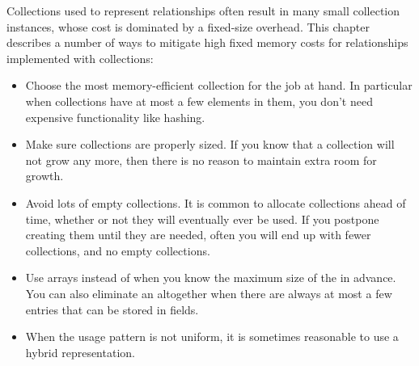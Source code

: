 Collections used to represent relationships often result in many small
collection instances, whose cost is dominated by a fixed-size
overhead. This chapter describes a number of ways to mitigate high fixed memory
costs for relationships implemented with collections:
\begin{itemize}
  \item Choose the most memory-efficient collection for the job at hand. In
  particular when collections have at most a few elements in them, you don't
  need expensive functionality like hashing. 
  \item Make sure collections are properly sized. If you know that a collection
  will not grow any more, then there is no reason to maintain extra room for
  growth.
  \item Avoid lots of empty collections. It is common to allocate collections 
 ahead of time, whether or not they will eventually ever be used. If you
 postpone creating them until they are needed, often you will end up with fewer collections, 
 and no empty collections.
 \item Use arrays instead of  when you know the maximum size
 of the  in advance. You can also eliminate an
  altogether when there are always at most a few entries that
 can be stored in fields.
 \item When the usage pattern is not uniform, it is sometimes reasonable to use
 a hybrid representation.
\end{itemize}




